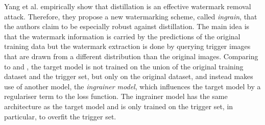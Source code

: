 Yang et al. \cite{yang_effectiveness_2019} empirically show that distillation is an effective watermark removal attack.
Therefore, they propose a new watermarking scheme, called \textit{ingrain}, that the authors claim to be especially robust against distillation. The main idea is that the watermark information is carried by the predictions of the original training data but the watermark extraction is done by querying trigger images that are drawn from a different distribution than the original images. Comparing to \cite{adi_turning_2018} and \cite{zhang_protecting_2018}, the target model is not trained on the union of the original training dataset and the trigger set, but only on the original dataset, and instead makes use of another model, the \textit{ingrainer model}, which influences the target model by a regulariser term to the loss function. The ingrainer model has the same architecture as the target model and is only trained on the trigger set, in particular, to overfit the trigger set.

